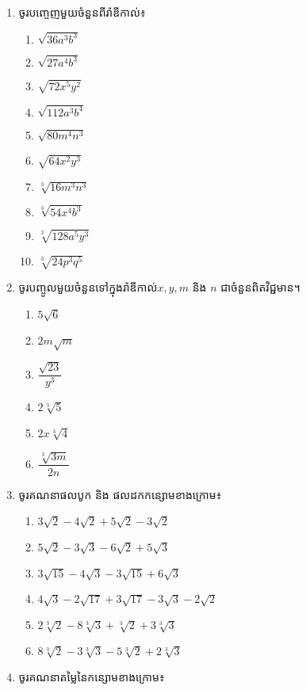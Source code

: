 \begin{enumerate}
\item ចូរបញ្ចេញមួយចំនួនពីរ៉ាឌីកាល់៖
\begin{enumerate}[k,4]
\item $\sqrt{36a^3b^3}$
\item $\sqrt{27a^4b^3}$
\item $\sqrt{72x^5y^2}$
\item $\sqrt{112a^3b^4}$
\item $\sqrt{80m^4n^3}$
\item $\sqrt{64x^2y^3}$
\item $\sqrt[3]{16m^3n^3}$
\item $\sqrt[3]{54x^4b^3}$
\item $\sqrt[3]{128a^5y^3}$
\item $\sqrt[3]{24p^3q^5}$
\end{enumerate}

\item ចូរបញ្ចូលមួយចំនួនទៅក្នុងរ៉ាឌីកាល់$x,y,m$ និង $n$ ជាចំនួនពិតវិជ្ជមាន។
\begin{enumerate}[k,4]
\item $5\sqrt{6}$
\item $2m\sqrt{m}$
\item $\dfrac{\sqrt{23}}{y^3}$
\item $2\sqrt[3]{5}$
\item $2x\sqrt[3]{4}$
\item $\dfrac{\sqrt[3]{3m}}{2n}$
\end{enumerate}
\item ចូរគណនាផលបូក និង ផលដកកន្សោមខាងក្រោម៖
\begin{enumerate}[k,4]
\item $3\sqrt{2}-4\sqrt{2}+5\sqrt{2}-3\sqrt{2}$
\item $5\sqrt{2}-3\sqrt{3}-6\sqrt{2}+5\sqrt{3}$
\item $3\sqrt{15}-4\sqrt{3}-3\sqrt{15}+6\sqrt{3}$
\item $4\sqrt{3}-2\sqrt{17}+3\sqrt{17}-3\sqrt{3}-2\sqrt{2}$
\item $2\sqrt[3]{2}-8\sqrt[3]{3}+\sqrt[3]{2}+3\sqrt[3]{3}$
\item $8\sqrt[3]{2}-3\sqrt[3]{3}-5\sqrt[3]{2}+2\sqrt[3]{3}$
\end{enumerate}

\item ចូរគណនាតម្លៃនៃកន្សោមខាងក្រោម៖
\begin{enumerate}[label=\alph*.]
\end{enumerate}


\end{enumerate}
